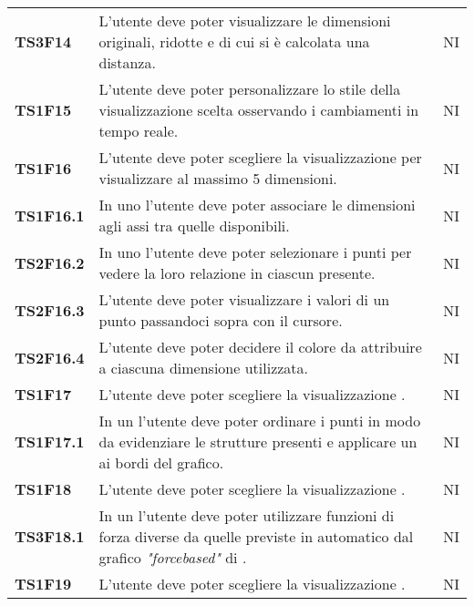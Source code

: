 {\begin{longtable}{ C{2cm} | C{12cm}| C{1.5cm} }
\textbf{TS3F14} & 
L'utente deve poter visualizzare le dimensioni originali, ridotte e di cui si è calcolata una distanza. & 
NI\\

\textbf{TS1F15} & 
L'utente deve poter personalizzare lo stile della visualizzazione scelta osservando i cambiamenti in tempo reale. & 
NI\\

\textbf{TS1F16} & 
L'utente deve poter scegliere la visualizzazione  per visualizzare  al massimo 5 dimensioni. & 
NI\\

\textbf{TS1F16.1} & 
In uno  l'utente deve poter associare le dimensioni agli assi tra quelle disponibili. & 
NI\\

\textbf{TS2F16.2} & 
In uno  l'utente deve poter selezionare i punti per vedere la loro relazione in ciascun  presente. & 
NI\\

\textbf{TS2F16.3} & 
L'utente deve poter visualizzare i valori di un punto passandoci sopra con il cursore. & 
NI\\

\textbf{TS2F16.4} & 
L'utente deve poter decidere il colore da attribuire a ciascuna dimensione utilizzata. & 
NI\\

\textbf{TS1F17} & 
L'utente deve poter scegliere la visualizzazione . & 
NI\\

\textbf{TS1F17.1} & 
In un  l'utente deve poter ordinare i punti in modo da evidenziare le strutture presenti e applicare un  ai bordi del grafico. & 
NI\\

\textbf{TS1F18} & 
L'utente deve poter scegliere la visualizzazione . & 
NI\\

\textbf{TS3F18.1} & 
In un  l'utente deve poter utilizzare funzioni di forza diverse da quelle previste in automatico dal grafico \textit{"forcebased"} di . & 
NI\\

\textbf{TS1F19} & 
L'utente deve poter scegliere la visualizzazione . & 
NI\\


\end{longtable}}
